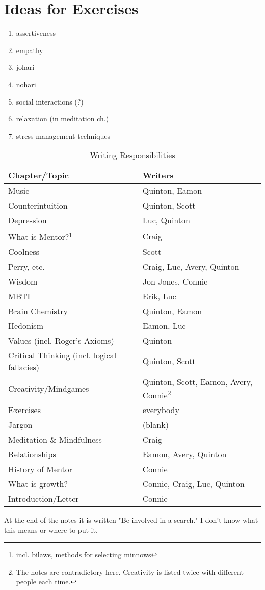 \documentclass[12pt]{article}
\begin{document}
\section{Ideas for Exercises}

\begin{enumerate}
	\item assertiveness
	\item empathy
	\item johari
	\item nohari
	\item social interactions (?)
	\item relaxation (in meditation ch.)
	\item stress management techniques
\end{enumerate}
	
\begin{table}[!!!h]
\begin{tabular}{|l|l|}
	\hline
	Chapter/Topic & Writers \\
	\hline
	Music & Quinton, Eamon \\
	\hline
	Counterintuition & Quinton, Scott\\
	\hline
	Depression & Luc, Quinton \\
	\hline
	What is Mentor?\footnote{incl. bilaws, methods for selecting minnows} & Craig \\
	\hline
	Coolness & Scott \\
	\hline
	Perry, etc. & Craig, Luc, Avery, Quinton \\
	\hline
	Wisdom & Jon Jones, Connie \\
	\hline
	MBTI & Erik, Luc \\
	\hline
	Brain Chemistry & Quinton, Eamon \\
	\hline
	Hedonism & Eamon, Luc \\
	\hline
	Values (incl. Roger's Axioms) 
	& Quinton \\
	\hline
	Critical Thinking (incl. logical fallacies) & Quinton, Scott \\
	\hline
	Creativity/Mindgames& Quinton, Scott, Eamon, Avery, Connie\footnote{The notes are contradictory here. Creativity is listed twice with different people each time.} \\
	\hline
	Exercises & everybody \\
	\hline
	Jargon & (blank) \\
	\hline
	Meditation \& Mindfulness & Craig\\
	\hline
	Relationships & Eamon, Avery, Quinton \\
	\hline
	History of Mentor & Connie \\
	\hline
	What is growth? & Connie, Craig, Luc, Quinton \\
	\hline
	Introduction/Letter & Connie \\
	\hline
\end{tabular}
\caption{Writing Responsibilities}
\end{table}

At the end of the notes it is written "Be involved in a search." I don't know what this means or where to put it.
\end{document}
